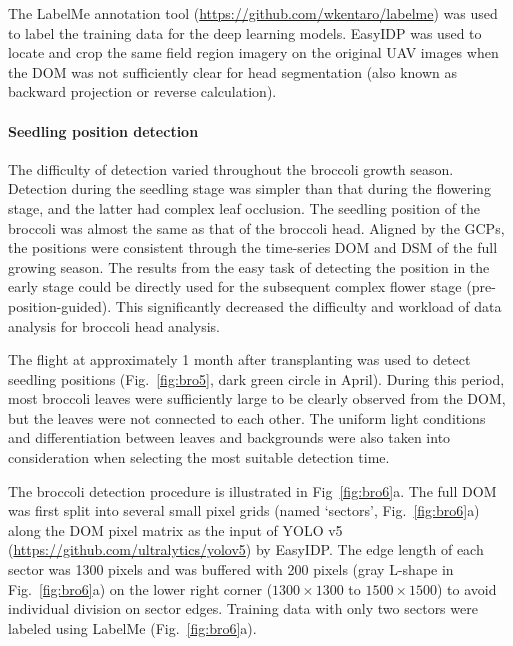 

The LabelMe annotation tool (\url{https://github.com/wkentaro/labelme}) was used to label the training data for the deep learning models. EasyIDP \citep[\url{https://github.com/UTokyo-FieldPhenomics-Lab/EasyIDP}]{wang_easyidp_2021} was used to locate and crop the same field region imagery on the original UAV images when the DOM was not sufficiently clear for head segmentation (also known as backward projection or reverse calculation).

\paragraph{Seedling position detection}

The difficulty of detection varied throughout the broccoli growth season. Detection during the seedling stage was simpler than that during the flowering stage, and the latter had complex leaf occlusion. The seedling position of the broccoli was almost the same as that of the broccoli head. Aligned by the GCPs, the positions were consistent through the time-series DOM and DSM of the full growing season. The results from the easy task of detecting the position in the early stage could be directly used for the subsequent complex flower stage (pre-position-guided). This significantly decreased the difficulty and workload of data analysis for broccoli head analysis.

The flight at approximately 1 month after transplanting was used to detect seedling positions (Fig.~\ref{fig:bro5}, dark green circle in April). During this period, most broccoli leaves were sufficiently large to be clearly observed from the DOM, but the leaves were not connected to each other. The uniform light conditions and differentiation between leaves and backgrounds were also taken into consideration when selecting the most suitable detection time.

The broccoli detection procedure is illustrated in Fig~\ref{fig:bro6}a. The full DOM was first split into several small pixel grids (named `sectors', Fig.~\ref{fig:bro6}a) along the DOM pixel matrix as the input of YOLO v5 (\url{https://github.com/ultralytics/yolov5}) by EasyIDP. The edge length of each sector was 1300 pixels and was buffered with 200 pixels (gray L-shape in Fig.~\ref{fig:bro6}a) on the lower right corner ($1300 \times 1300$ to $1500 \times 1500$) to avoid individual division on sector edges. Training data with only two sectors were labeled using LabelMe (Fig.~\ref{fig:bro6}a). 

